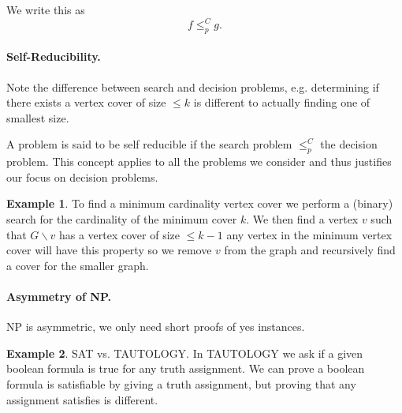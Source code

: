 \documentclass[11pt,a4paper]{article}
\theoremstyle{definition}
\newtheorem*{ex}{Example}
\begin{document}
We write this as 
\[
f\le_p^C g.
\]

\paragraph{Self-Reducibility.}
Note the difference between search and decision problems, e.g. determining if there exists a vertex cover of size $\le k$ is different to actually finding one of smallest size.

A problem is said to be self reducible if the search problem $\le_p^C$ the decision problem.
This concept applies to all the problems we consider and thus justifies our focus on decision problems.

\begin{ex}
To find a minimum cardinality vertex cover we perform a (binary) search for the cardinality of the minimum cover $k$.
We then find a vertex $v$ such that $G\smallsetminus v$ has a vertex cover of size $\le k - 1$ any vertex in the minimum vertex cover will have this property so we remove $v$ from the graph and recursively find a cover for the smaller graph.
\end{ex}




\paragraph{Asymmetry of NP.}
NP is asymmetric, we only need short proofs of yes instances.

\begin{ex}
SAT vs. TAUTOLOGY.
In TAUTOLOGY we ask if a given boolean formula is true for any truth assignment.
We can prove a boolean formula is satisfiable by giving a truth assignment, but proving that any assignment satisfies is different.
\end{ex}
\end{document}
